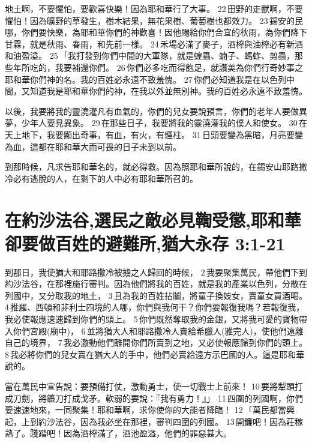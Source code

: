 地土啊，不要懼怕，要歡喜快樂！因為耶和華行了大事。 22 田野的走獸啊，不要懼怕！因為曠野的草發生，樹木結果，無花果樹、葡萄樹也都效力。 23 錫安的民哪，你們要快樂，為耶和華你們的神歡喜！因他賜給你們合宜的秋雨，為你們降下甘霖，就是秋雨、春雨，和先前一樣。 24 禾場必滿了麥子，酒榨與油榨必有新酒和油盈溢。 25 「我打發到你們中間的大軍隊，就是蝗蟲、蝻子、螞蚱、剪蟲，那些年所吃的，我要補還你們。 26 你們必多吃而得飽足，就讚美為你們行奇妙事之耶和華你們神的名。我的百姓必永遠不致羞愧。 27 你們必知道我是在以色列中間，又知道我是耶和華你們的神，在我以外並無別神。我的百姓必永遠不致羞愧。

以後，我要將我的靈澆灌凡有血氣的，你們的兒女要說預言，你們的老年人要做異夢，少年人要見異象。 29 在那些日子，我要將我的靈澆灌我的僕人和使女。 30 在天上地下，我要顯出奇事，有血，有火，有煙柱。 31 日頭要變為黑暗，月亮要變為血，這都在耶和華大而可畏的日子未到以前。

到那時候，凡求告耶和華名的，就必得救。因為照耶和華所說的，在錫安山耶路撒冷必有逃脫的人，在剩下的人中必有耶和華所召的。

\section{在約沙法谷,選民之敵必見鞫受懲,耶和華卻要做百姓的避難所,猶大永存 3:1-21}
到那日，我使猶大和耶路撒冷被擄之人歸回的時候， 2 我要聚集萬民，帶他們下到約沙法谷，在那裡施行審判。因為他們將我的百姓，就是我的產業以色列，分散在列國中，又分取我的地土， 3 且為我的百姓拈鬮，將童子換妓女，賣童女買酒喝。 4 推羅、西頓和非利士四境的人哪，你們與我何干？你們要報復我嗎？若報復我，我必使報應速速歸到你們的頭上。 5 你們既然奪取我的金銀，又將我可愛的寶物帶入你們宮殿(廟中)， 6 並將猶大人和耶路撒冷人賣給希臘人(雅完人)，使他們遠離自己的境界， 7 我必激動他們離開你們所賣到之地，又必使報應歸到你們的頭上。 8 我必將你們的兒女賣在猶大人的手中，他們必賣給遠方示巴國的人。這是耶和華說的。

當在萬民中宣告說：要預備打仗，激動勇士，使一切戰士上前來！ 10 要將犁頭打成刀劍，將鐮刀打成戈矛。軟弱的要說：『我有勇力！』」 11 四圍的列國啊，你們要速速地來，一同聚集！耶和華啊，求你使你的大能者降臨！ 12 「萬民都當興起，上到約沙法谷，因為我必坐在那裡，審判四圍的列國。 13 開鐮吧！因為莊稼熟了。踐踏吧！因為酒榨滿了，酒池盈溢，他們的罪惡甚大。

